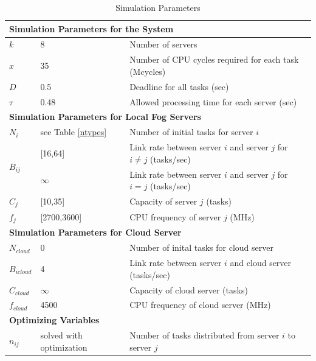 \begin{table}[ht!]
\caption{Simulation Parameters}
\centering
\small
\begin{tabular}{| m{0.8cm} | m{1.6cm} | m{15em} |}
    \hline
    \multicolumn{3}{|l|}{\textbf{Simulation Parameters for the System}}\\
    \hline
    $k$ & 8 & Number of servers \\
    \hline
    $x$ & 35 & Number of CPU cycles required for each task (Mcycles)\\
    \hline
    $D$ & 0.5 & Deadline for all tasks (sec)\\
    \hline
    $\tau$ & 0.48 & Allowed processing time for each server (sec)\\
    \hline
    \multicolumn{3}{|l|}{\textbf{Simulation Parameters for Local Fog Servers}}\\
    \hline
    $N_{i}$ & see Table \ref{ntypes} & Number of initial tasks for server $i$\\
    \hline
    \multirow{2}{*}{$B_{ij}$} & [16,64] & Link rate between server $i$ and server $j$ for $i\ne j$ (tasks/sec) \\ \cline{2-3}
    & $\infty$ & Link rate between server $i$ and server $j$ for $i=j$ (tasks/sec) \\
    \hline
    $C_{j}$ & [10,35] & Capacity of server $j$ (tasks)\\
    \hline
    $f_{j}$ & [2700,3600] & CPU frequency of server $j$ (MHz)\\
    \hline
    \multicolumn{3}{|l|}{\textbf{Simulation Parameters for Cloud Server}}\\
    \hline
    $N_{cloud}$ & 0 & Number of inital tasks for cloud server\\
    \hline
    $B_{icloud}$ & 4 & Link rate between server $i$ and cloud server (tasks/sec)\\
    \hline
    $C_{cloud}$ & $\infty$ & Capacity of cloud server (tasks)\\
    \hline
    $f_{cloud}$ & 4500 & CPU frequency of cloud server (MHz)\\
    \hline\hline
    \multicolumn{2}{|l|}{\textbf{Optimizing Variables}}\\
    \hline
    $n_{ij}$ & solved with optimization & Number of tasks distributed from server $i$ to server $j$\\
    \hline
\end{tabular}
\label{simvar}
\end{table}

